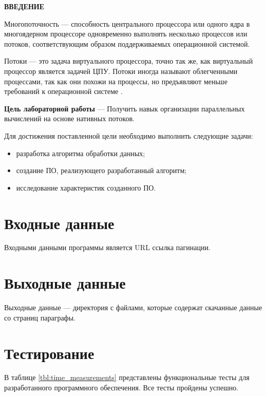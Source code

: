 \begin{center}
    \textbf{ВВЕДЕНИЕ}
\end{center}




Многопоточность --- способность центрального процессора или одного ядра в
многоядерном процессоре одновременно выполнять несколько процессов или
потоков, соответствующим образом поддерживаемых операционной системой.

Потоки --- это задача виртуального процессора, точно так же, как
виртуальный процессор является задачей ЦПУ. Потоки иногда называют
облегченными процессами, так как они похожи на процессы, но предъявляют
меньше требований к операционной системе \cite{bib0}.




\textbf{Цель лабораторной работы} --- Получить навык организации параллельных
вычислений на основе нативных потоков.

Для достижения поставленной цели необходимо выполнить следующие задачи:
\begin{itemize}
    \item разработка алгоритма обработки данных;
    \item создание ПО, реализующего разработанный алгоритм;
    \item исследование характеристик созданного ПО.
\end{itemize}


\section{Входные данные}
Входными данными программы является URL ссылка пагинации.


\section{Выходные данные}
Выходные данные --- директория с файлами, которые содержат скачанные данные
со страниц параграфы.

\clearpage

\section{Тестирование}
В таблице \ref{tbl:time_measurements} представлены функциональные тесты для разработанного
программного обеспечения. Все тесты пройдены успешно.


